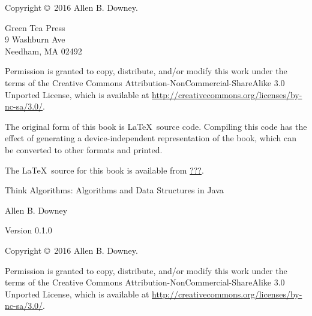\documentclass[12pt]{book}
\newcommand{\thetitle}{Think Algorithms}
\newcommand{\thesubtitle}{Algorithms and Data Structures in Java}
\newcommand{\theauthors}{Allen B. Downey}
\newcommand{\theversion}{0.1.0}
\theoremstyle{exercise}
\begin{document}
\begin{latexonly}
\newpage
\thispagestyle{empty}

Copyright \copyright ~2016 \theauthors.

\vspace{0.2in}

\begin{flushleft}
Green Tea Press \\
9 Washburn Ave \\
Needham, MA 02492
\end{flushleft}

Permission is granted to copy, distribute, and/or modify this work under the terms of the Creative Commons Attribution-NonCommercial-ShareAlike 3.0 Unported License, which is available at \url{http://creativecommons.org/licenses/by-nc-sa/3.0/}.

The original form of this book is \LaTeX\ source code.
Compiling this code has the effect of generating a device-independent representation of the book, which can be converted to other formats and printed.

The \LaTeX\ source for this book is available from \url{???}.


\cleardoublepage
\setcounter{tocdepth}{1}
\tableofcontents

\end{latexonly}


\begin{htmlonly}

\vspace{1em}

{\Large \thetitle: \thesubtitle}

{\large \theauthors}

Version \theversion

\vspace{1em}

Copyright \copyright ~2016 \theauthors.

Permission is granted to copy, distribute, and/or modify this work under the terms of the Creative Commons Attribution-NonCommercial-ShareAlike 3.0 Unported License, which is available at \url{http://creativecommons.org/licenses/by-nc-sa/3.0/}.

\vspace{1em}

\end{htmlonly}
\end{document}
